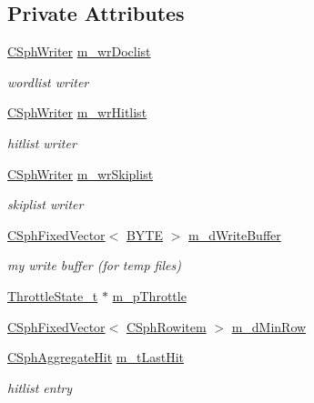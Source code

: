 \subsection*{Private Attributes}
\begin{DoxyCompactItemize}
\item 
\hyperlink{classCSphWriter}{C\-Sph\-Writer} \hyperlink{classCSphHitBuilder_a0755d7324f9859544faf7c15d9eb4c21}{m\-\_\-wr\-Doclist}
\begin{DoxyCompactList}\small\item\em wordlist writer \end{DoxyCompactList}\item 
\hyperlink{classCSphWriter}{C\-Sph\-Writer} \hyperlink{classCSphHitBuilder_ada1e5504058e0b142ea1e59856308bae}{m\-\_\-wr\-Hitlist}
\begin{DoxyCompactList}\small\item\em hitlist writer \end{DoxyCompactList}\item 
\hyperlink{classCSphWriter}{C\-Sph\-Writer} \hyperlink{classCSphHitBuilder_a25cffe2489b5a47bcbefae0836ed5dad}{m\-\_\-wr\-Skiplist}
\begin{DoxyCompactList}\small\item\em skiplist writer \end{DoxyCompactList}\item 
\hyperlink{classCSphFixedVector}{C\-Sph\-Fixed\-Vector}$<$ \hyperlink{sphinxstd_8h_a4ae1dab0fb4b072a66584546209e7d58}{B\-Y\-T\-E} $>$ \hyperlink{classCSphHitBuilder_a8cbbb9538f110fe5b434266164f97f22}{m\-\_\-d\-Write\-Buffer}
\begin{DoxyCompactList}\small\item\em my write buffer (for temp files) \end{DoxyCompactList}\item 
\hyperlink{structThrottleState__t}{Throttle\-State\-\_\-t} $\ast$ \hyperlink{classCSphHitBuilder_a3bff4d2a765ef1e9fcaf684ceacf94ea}{m\-\_\-p\-Throttle}
\item 
\hyperlink{classCSphFixedVector}{C\-Sph\-Fixed\-Vector}$<$ \hyperlink{sphinx_8h_a6a2df0f05f3397df8b6e230fda6f852f}{C\-Sph\-Rowitem} $>$ \hyperlink{classCSphHitBuilder_aaff44dbc2bd11c9b3cd40d0beee07b16}{m\-\_\-d\-Min\-Row}
\item 
\hyperlink{structCSphAggregateHit}{C\-Sph\-Aggregate\-Hit} \hyperlink{classCSphHitBuilder_a2d91f6e0d9a26abfa66e29557e8559e5}{m\-\_\-t\-Last\-Hit}
\begin{DoxyCompactList}\small\item\em hitlist entry \end{DoxyCompactList}\item 

\end{DoxyCompactItemize}
